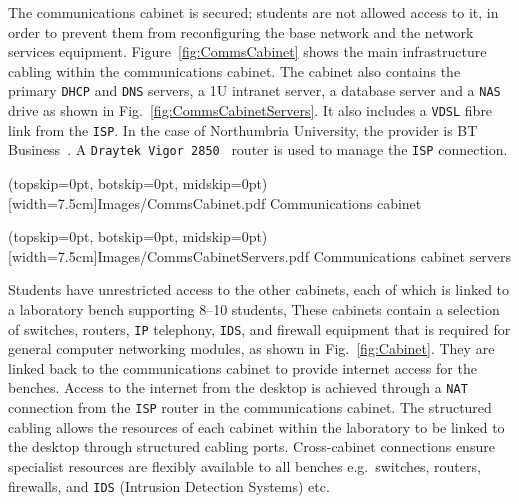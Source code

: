 \documentclass{ieeeaccess}
\begin{document}
The communications cabinet is secured; students are not allowed access to it,
in order to prevent them from reconfiguring the base network and the network
services equipment. Figure~\ref{fig:CommsCabinet} shows the main infrastructure
cabling within the communications cabinet.  The cabinet also contains the
primary \texttt{DHCP} and \texttt{DNS} servers, a 1U intranet server, a
database server and a \texttt{NAS} drive as shown in
Fig.~\ref{fig:CommsCabinetServers}. It also includes a \texttt{VDSL} fibre link
from the \texttt{ISP}. In the case of Northumbria University, the provider is
BT Business~\cite{BT:17}. A \texttt{Draytek Vigor 2850}~\cite{DC:17} router is
used to manage the \texttt{ISP} connection. 

\Figure[t!](topskip=0pt, botskip=0pt, midskip=0pt)[width=7.5cm]{Images/CommsCabinet.pdf}
{Communications cabinet\label{fig:CommsCabinet}}

\Figure[t!](topskip=0pt, botskip=0pt, midskip=0pt)[width=7.5cm]{Images/CommsCabinetServers.pdf}
{Communications cabinet servers\label{fig:CommsCabinetServers}}


Students have unrestricted access to the other cabinets, each of which is
linked to a laboratory bench supporting 8--10 students, These cabinets contain
a selection of switches, routers, \texttt{IP} telephony, \texttt{IDS}, and
firewall equipment that is required for general computer networking modules, as
shown in Fig.~\ref{fig:Cabinet}.  They are linked back to the communications
cabinet to provide internet access for the benches. Access to the internet from
the desktop is achieved through a \texttt{NAT} connection from the \texttt{ISP}
router in the communications cabinet.  The structured cabling allows the
resources of each cabinet within the laboratory to be linked to the desktop
through structured cabling ports.  Cross-cabinet connections ensure specialist
resources are flexibly available to all benches e.g.\ switches, routers,
firewalls, and \texttt{IDS} (Intrusion Detection Systems) etc.
\end{document}
